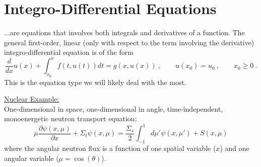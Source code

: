 \documentclass[12pt]{article}
\begin{document}
\section{Integro-Differential Equations}
...are equations that involves both integrals and derivatives of a function.
The general first-order, linear (only with respect to the term involving the derivative) integro-differential equation is of the form
\[
\frac{d}{dx}u(x) + \int_{x_0}^{x} f(t,u(t)) dt = g(x,u(x))\:, \qquad u(x_0) = u_0 \:, \qquad x_0 \geq 0\:.
\]
This is the equation type we will likely deal with the most.

\underline{Nuclear Example:}\\
One-dimensional in space, one-dimensional in angle, time-independent, monoenergetic neutron transport equation:	
\[
\mu \frac{\partial \psi(x,\mu)}{\partial x} + \Sigma_t \psi(x,\mu) = \frac{\Sigma_s}{2}\int_{-1}^{1} d\mu' \psi(x,\mu') + S(x, \mu)
\]
where the angular neutron flux is a function of one spatial variable ($x$) and one angular variable ($\mu = \cos(\theta)$).

\end{document}
